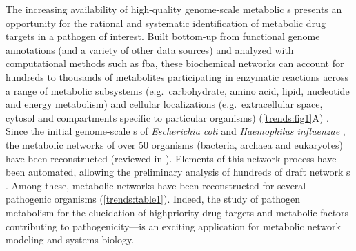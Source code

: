 The increasing availability of high-quality genome-scale 
metabolic s \cite{Oberhardt:2009jw} presents an opportunity for the 
rational and systematic identification of metabolic drug 
targets in a pathogen of interest. Built bottom-up from functional 
genome annotations (and a variety of other data sources) and 
analyzed with computational methods such as \gls{fba}, these biochemical networks can account 
for hundreds to thousands of metabolites participating in enzymatic 
reactions across a range of metabolic subsystems (e.g.\ carbohydrate, 
amino acid, lipid, nucleotide and energy metabolism) and cellular 
localizations (e.g.\ extracellular space, cytosol and compartments 
specific to particular organisms) (\autoref{trends:fig1}A) \cite{Thiele:2010fr}. Since the 
initial genome-scale s of \textit{Escherichia coli} \cite{Edwards:2000cn,Reed:2003bj} 
and \textit{Haemophilus influenzae} \cite{Edwards:1999ix,Schilling:2000ig}, the metabolic networks of over 
50 organisms (bacteria, archaea and eukaryotes) have been 
reconstructed (reviewed in \cite{Oberhardt:2009jw}). Elements of this network 
 process have been automated, allowing the preliminary 
analysis of hundreds of draft network s \cite{Henry:2010dg}. Among 
these, metabolic networks have been reconstructed for several pathogenic 
organisms (\autoref{trends:table1}). Indeed, the study of pathogen metabolism-for the 
elucidation of highpriority drug targets and metabolic factors 
contributing to pathogenicity—is an exciting application for 
metabolic network modeling and systems biology.

